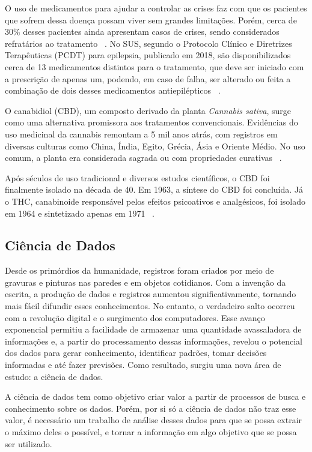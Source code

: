 \documentclass[article,a4paper,12pt,brazil,sumario=tradicional]{abntex2}
\begin{document}
O uso de medicamentos para ajudar a controlar as crises faz com que os pacientes que sofrem dessa doença possam viver sem grandes limitações. Porém, cerca de 30\% desses pacientes ainda apresentam casos de crises, sendo considerados refratários ao tratamento ~\cite{relatorioSociedadeConitec}. No SUS, segundo o Protocolo Clínico e Diretrizes Terapêuticas (PCDT) para epilepsia, publicado em 2018, são disponibilizados cerca de 13 medicamentos distintos para o tratamento, que deve ser iniciado com a prescrição de apenas um, podendo, em caso de falha, ser alterado ou feita a combinação de dois desses medicamentos antiepilépticos ~\cite{relatorioSociedadeConitec}.

O canabidiol (CBD), um composto derivado da planta \textit{Cannabis sativa}, surge como uma alternativa promissora aos tratamentos convencionais. Evidências do uso medicinal da cannabis remontam a 5 mil anos atrás, com registros em diversas culturas como China, Índia, Egito, Grécia, Ásia e Oriente Médio. No uso comum, a planta era considerada sagrada ou com propriedades curativas ~\cite{cannabis12000anos}.

Após séculos de uso tradicional e diversos estudos científicos, o CBD foi finalmente isolado na década de 40. Em 1963, a síntese do CBD foi concluída. Já o THC, canabinoide responsável pelos efeitos psicoativos e analgésicos, foi isolado em 1964 e sintetizado apenas em 1971 ~\cite{cannabis12000anos}.

\subsection{Ciência de Dados}

Desde os primórdios da humanidade, registros foram criados por meio de gravuras e pinturas nas paredes e em objetos cotidianos. Com a invenção da escrita, a produção de dados e registros aumentou significativamente, tornando mais fácil difundir esses conhecimentos. No entanto, o verdadeiro salto ocorreu com a revolução digital e o surgimento dos computadores. Esse avanço exponencial permitiu a facilidade de armazenar uma quantidade avassaladora de informações e, a partir do processamento dessas informações, revelou o potencial dos dados para gerar conhecimento, identificar padrões, tomar decisões informadas e até fazer previsões. Como resultado, surgiu uma nova área de estudo: a ciência de dados.

A ciência de dados tem como objetivo criar valor a partir de processos de busca e conhecimento sobre os dados. Porém, por si só a ciência de dados não traz esse valor, é necessário um trabalho de análise desses dados para que se possa extrair o máximo deles o possível, e tornar a informação em algo objetivo que se possa ser utilizado.
\end{document}
